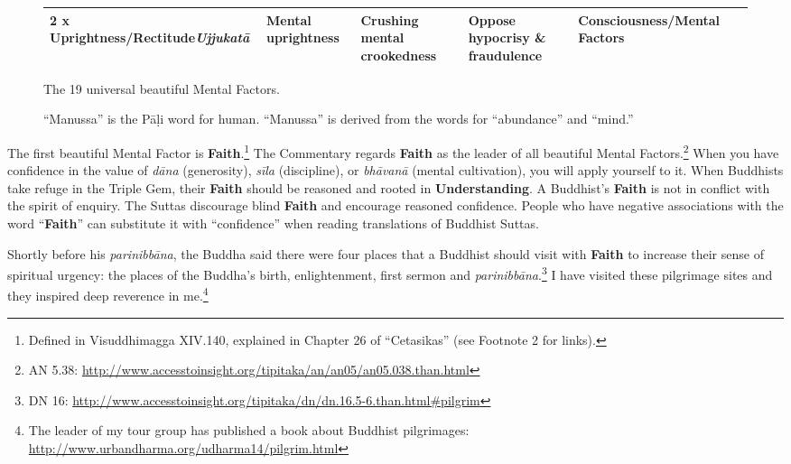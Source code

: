 \begin{figure} [H]
\begin{tabular}{P{0.25\textwidth} | C{.185\textwidth} C{0.185\textwidth} C{0.185\textwidth} C{0.195\textwidth} m{0mm}}
2 x \textbf{Uprightness}/\newline Rectitude\newline \textit{Ujjukatā} & Mental uprightness & Crushing mental crookedness & Oppose hypocrisy \& fraudulence & Consciousness/\newline Mental Factors &\\[12mm]
\bottomrule
\end{tabular} 

\caption{The 19 universal beautiful Mental Factors.}

\end{figure}

\pagebreak

\begin{figure}[H]
\centering

\caption{“Manussa” is the Pāḷi word for human. “Manussa” is derived from the words for “abundance” and “mind.”}
\label{fig:Key}
\end{figure}

The first beautiful Mental Factor is \textbf{Faith}.\footnote{Defined in Visuddhimagga XIV.140, explained in Chapter 26 of “Cetasikas” (see Footnote 2 for links).} The Commentary regards \textbf{Faith} as the leader of all beautiful Mental Factors.\footnote{AN 5.38: \url{http://www.accesstoinsight.org/tipitaka/an/an05/an05.038.than.html}} When you have confidence in the value of \textit{dāna} (generosity), \textit{sīla} (discipline), or \textit{bhāvanā} (mental cultivation), you will apply yourself to it. When Buddhists take refuge in the Triple Gem, their \textbf{Faith} should be reasoned and rooted in \textbf{Understanding}. A Buddhist’s \textbf{Faith} is not in conflict with the spirit of enquiry. The Suttas discourage blind \textbf{Faith} and encourage reasoned confidence. People who have negative associations with the word “\textbf{Faith}” can substitute it with “confidence” when reading translations of Buddhist Suttas.

Shortly before his \textit{parinibbāna}, the Buddha said there were four places that a Buddhist should visit with \textbf{Faith} to increase their sense of spiritual urgency: the places of the Buddha’s birth, enlightenment, first sermon and \textit{parinibbāna}.\footnote{DN 16: \url{http://www.accesstoinsight.org/tipitaka/dn/dn.16.5-6.than.html\#pilgrim}} I have visited these pilgrimage sites and they inspired deep reverence in me.\footnote{The leader of my tour group has published a book about Buddhist pilgrimages: \url{http://www.urbandharma.org/udharma14/pilgrim.html}}

